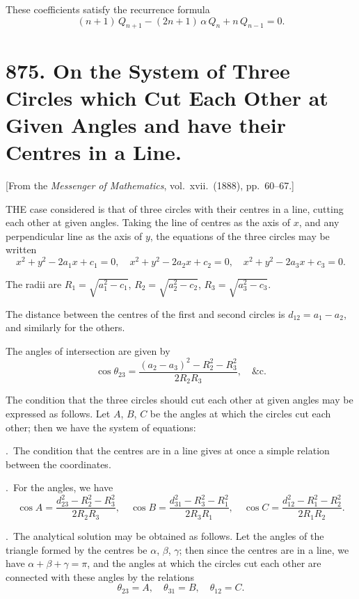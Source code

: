 \documentclass[11pt,a4paper]{book}
\begin{document}
These coefficients satisfy the recurrence formula
\[
(n+1)\,Q_{n+1} - (2n+1)\,\alpha\,Q_{n} + n\,Q_{n-1} = 0.
\]

\newpage
\section[875]{875. On the System of Three Circles which Cut Each Other at Given Angles and have their Centres in a Line.}
\label{sec:875}

[From the \textit{Messenger of Mathematics}, vol.\ xvii.\ (1888), pp.\ 60--67.]

\medskip\noindent
THE case considered is that of three circles with their centres in a line, cutting each other at given angles. Taking the line of centres as the axis of $x$, and any perpendicular line as the axis of $y$, the equations of the three circles may be written
\[
x^{2} + y^{2} - 2a_{1}x + c_{1} = 0, \quad
x^{2} + y^{2} - 2a_{2}x + c_{2} = 0, \quad
x^{2} + y^{2} - 2a_{3}x + c_{3} = 0.
\]

The radii are $R_{1} = \sqrt{a_{1}^{2} - c_{1}}$, $R_{2} = \sqrt{a_{2}^{2} - c_{2}}$, $R_{3} = \sqrt{a_{3}^{2} - c_{3}}$.

The distance between the centres of the first and second circles is $d_{12} = a_{1} - a_{2}$, and similarly for the others.

The angles of intersection are given by
\[
\cos \theta_{23} = \frac{(a_{2} - a_{3})^{2} - R_{2}^{2} - R_{3}^{2}}{2R_{2}R_{3}}, \quad \&\text{c.}
\]

\medskip\noindent
The condition that the three circles should cut each other at given angles may be expressed as follows. Let $A$, $B$, $C$ be the angles at which the circles cut each other; then we have the system of equations:

\medskip{}.\ The condition that the centres are in a line gives at once a simple relation between the coordinates.

\medskip{}.\ For the angles, we have
\[
\cos A = \frac{d_{23}^{2} - R_{2}^{2} - R_{3}^{2}}{2R_{2}R_{3}}, \quad
\cos B = \frac{d_{31}^{2} - R_{3}^{2} - R_{1}^{2}}{2R_{3}R_{1}}, \quad
\cos C = \frac{d_{12}^{2} - R_{1}^{2} - R_{2}^{2}}{2R_{1}R_{2}}.
\]

\medskip{}.\ The analytical solution may be obtained as follows. Let the angles of the triangle formed by the centres be $\alpha$, $\beta$, $\gamma$; then since the centres are in a line, we have $\alpha + \beta + \gamma = \pi$, and the angles at which the circles cut each other are connected with these angles by the relations
\[
\theta_{23} = A, \quad \theta_{31} = B, \quad \theta_{12} = C.
\]
\end{document}
